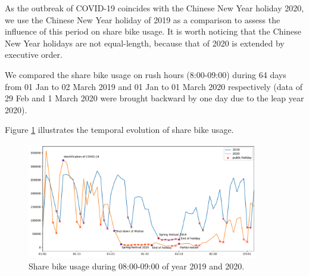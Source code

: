 \documentclass[ijgi,submit,moreauthors,pdftex]{Definitions/mdpi}
\begin{document}
As the outbreak of COVID-19 coincides with the Chinese New Year holiday 2020, we use the Chinese New Year holiday of 2019 as a comparison to assess the influence of this period on share bike usage.
It is worth noticing that the Chinese New Year holidays are not equal-length, because that of 2020 is extended by executive order.

We compared the share bike usage on rush hours (8:00-09:00) during 64 days from 01 Jan to 02 March 2019 and 01 Jan to 01 March 2020 respectively (data of 29 Feb and 1 March 2020 were brought backward by one day due to the leap year 2020).


Figure \ref{fig:hour_comparison_8} %
 illustrates the temporal evolution of share bike usage.

\begin{figure}[ht]
    \centering
    \includegraphics[width=0.9\textwidth]{Figures/hour_8-eps-converted-to.pdf}
    \caption{Share bike usage during 08:00-09:00 of year 2019 and 2020.}
    \label{fig:hour_comparison_8}
\end{figure}
\end{document}
